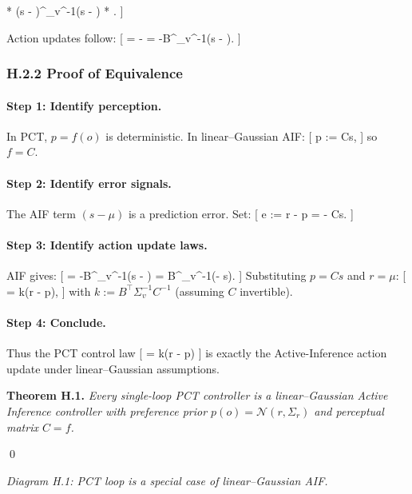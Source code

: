 \documentclass[11pt,a4paper,twoside]{article}
\begin{document}
* (s - \mu)^\top \Sigma_v^{-1}(s - \mu)
* .
  ]

Action updates follow:
[
 = -
= -B^\top \Sigma_v^{-1}(s - \mu).
]

\subsubsection*{H.2.2 Proof of Equivalence}

\paragraph{Step 1: Identify perception.}
In PCT, $p = f(o)$ is deterministic. In linear--Gaussian AIF:
[
p := Cs,
]
so $f = C$.

\paragraph{Step 2: Identify error signals.}
The AIF term $(s - \mu)$ is a prediction error. Set:
[
e := r - p = \mu - Cs.
]

\paragraph{Step 3: Identify action update laws.}
AIF gives:
[
 = -B^\top \Sigma_v^{-1}(s - \mu)
= B^\top \Sigma_v^{-1}(\mu - s).
]
Substituting $p = Cs$ and $r = \mu$:
[
 = k(r - p),
]
with $k := B^\top \Sigma_v^{-1} C^{-1}$ (assuming $C$ invertible).

\paragraph{Step 4: Conclude.}

Thus the PCT control law
[
 = k(r - p)
]
is exactly the Active-Inference action update under linear--Gaussian assumptions.

\medskip

\noindent\textbf{Theorem H.1.}
\emph{Every single-loop PCT controller is a linear--Gaussian Active Inference controller with preference prior $p(o) = \mathcal{N}(r, \Sigma_r)$ and perceptual matrix $C = f$.}

\qed

\begin{center}

\emph{Diagram H.1: PCT loop is a special case of linear--Gaussian AIF.}
\end{center}
\end{document}
